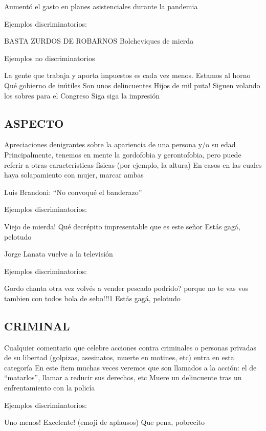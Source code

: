 Aumentó el gasto en planes asistenciales durante la pandemia

Ejemplos discriminatorios:

BASTA ZURDOS DE ROBARNOS
Bolcheviques de mierda

Ejemplos no discriminatorios

La gente que trabaja y aporta impuestos es cada vez menos. Estamos al horno
Qué gobierno de inútiles
Son unos delincuentes
Hijos de mil puta!
Siguen volando los sobres para el Congreso
Siga siga la impresión




\subsection{ASPECTO}

Apreciaciones denigrantes sobre la apariencia de una persona y/o su edad
Principalmente, tenemos en mente la gordofobia y gerontofobia, pero puede referir a otras características físicas (por ejemplo, la altura)
En casos en las cuales haya solapamiento con mujer, marcar ambas


Luis Brandoni: “No convoqué el banderazo”

Ejemplos discriminatorios:

Viejo de mierda!
Qué decrépito impresentable que es este señor
Estás gagá, pelotudo

Jorge Lanata vuelve a la televisión 

Ejemplos discriminatorios:

Gordo chanta otra vez volvés a vender pescado podrido?
porque no te vas vos tambien con todos bola de sebo!!!1
Estás gagá, pelotudo









\subsection{CRIMINAL}

Cualquier comentario que celebre acciones contra criminales o personas privadas de su libertad (golpizas, asesinatos, muerte en motines, etc) entra en esta categoría
En este ítem muchas veces veremos que son llamados a la acción: el de “matarlos”, llamar a reducir sus derechos, etc
Muere un delincuente tras un enfrentamiento con la policía

Ejemplos discriminatorios:

Uno menos!
Excelente!
(emoji de aplausos)
Que pena, pobrecito

